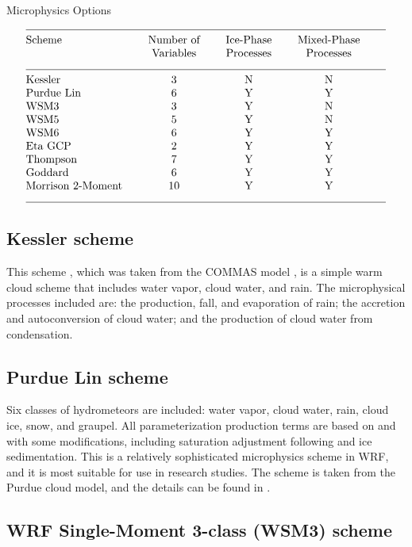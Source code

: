 \begin{table}
\caption{Microphysics Options}
\label{microphysics table}
$$\vbox
{\halign{#\hfil \qquad & \hfil#\hfil \qquad &
\hfil#\hfil \qquad & \hfil#\hfil \qquad &  \hfil#\hfil \cr
\multispan4\hrulefill \cr
Scheme   & Number of   &   Ice-Phase        &      Mixed-Phase          \cr
         & Variables   &   Processes        &      Processes          \cr
\multispan4\hrulefill \cr
Kessler     &      3       &       N         &       N   \cr
Purdue Lin  &      6       &       Y         &       Y   \cr
WSM3        &      3       &       Y         &       N   \cr
WSM5        &      5       &       Y         &       N   \cr
WSM6        &      6       &       Y         &       Y   \cr
Eta GCP     &      2       &       Y         &       Y   \cr
Thompson    &      7       &       Y         &       Y   \cr
Goddard     &      6       &       Y         &       Y   \cr
Morrison 2-Moment     &      10      &       Y         &       Y   \cr
\multispan4\hrulefill \cr
}}$$
\end{table}

\subsection{Kessler scheme}

This scheme \citep{kessler69}, which was taken from the COMMAS model
\citep{wicker95}, is a simple 
warm cloud scheme that includes water vapor, cloud water, and rain. 
The microphysical processes included are: the production, fall, and 
evaporation of rain; the accretion and autoconversion of cloud water;
and the production of cloud water from condensation.

\subsection{Purdue Lin scheme}

Six classes of hydrometeors are included: water vapor, cloud water, rain, cloud ice, 
snow, and graupel. All parameterization production terms are based on \citet{lin83}
and \citet{rutledge84} with some modifications, including saturation 
adjustment following \citet{tao89} and ice sedimentation. This is a relatively 
sophisticated microphysics scheme in WRF, and it is most suitable for use 
in research studies. The scheme is taken from the Purdue cloud model, and 
the details can be found in \citet{chen02}.

\subsection{WRF Single-Moment 3-class (WSM3) scheme}

